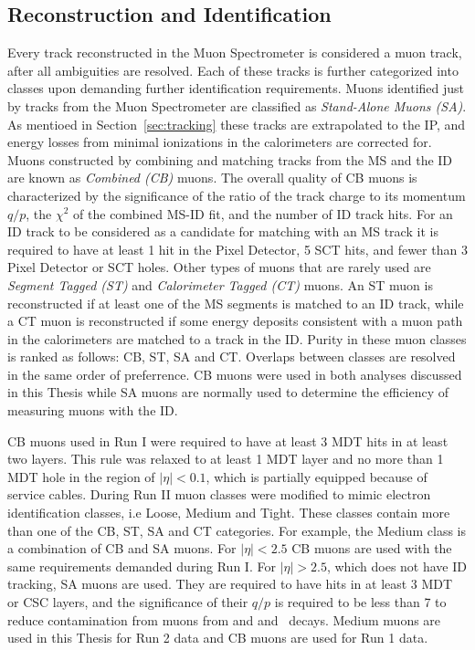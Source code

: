 \subsection{Reconstruction and Identification}
\label{sec:muReco}
\par Every track reconstructed in the Muon Spectrometer is considered a muon track, 
after all ambiguities are resolved. Each of these tracks is further categorized into 
classes upon demanding further identification requirements. Muons identified 
just by tracks from the Muon Spectrometer are classified as {\it Stand-Alone 
Muons (SA)}. As mentioed in Section~\ref{sec:tracking} these tracks are extrapolated to the IP, 
and energy losses from minimal ionizations in the calorimeters are corrected for. 
Muons constructed by combining and matching tracks from the MS and the ID are 
known as {\it Combined (CB)} muons. The overall quality of CB muons is characterized by the significance of 
the ratio of the track charge to its momentum $q/p$, the $\chi^2$ of the combined 
MS-ID fit, and the number of ID track hits. For an ID track to be considered as 
a candidate for matching with an MS track it is required to have at least 1 hit 
in the Pixel Detector, 5 SCT hits, and fewer than 3 Pixel Detector or SCT holes. 
Other types of muons that are rarely used are {\it Segment Tagged (ST)} and 
{\it Calorimeter Tagged (CT)} muons. An ST muon is reconstructed if at least one 
of the MS segments is matched to an ID track, while a CT muon is reconstructed if 
some energy deposits consistent with a muon path in the calorimeters are matched 
to a track in the ID. Purity in these muon classes is ranked as follows: CB, ST, 
SA and CT. Overlaps between classes are resolved in the same order 
of preferrence. CB muons were used in both analyses discussed in this Thesis while 
SA muons are normally used to determine the efficiency of measuring muons with the 
ID. 

\par CB muons used in Run I were required to have at least 3 MDT hits in at least two 
layers. This rule was relaxed to at least 1 MDT layer  and no more than 1 MDT hole in 
the region of $|\eta|<0.1$, which is partially equipped because of service cables.
During Run II muon classes were modified to mimic electron identification classes, 
i.e Loose, Medium and Tight. These classes contain more than one of the CB, ST, SA and 
CT categories. For example, the Medium class is a combination of CB and SA muons. 
For $|\eta|<2.5$ CB muons are used with the same requirements demanded during Run I. For 
$|\eta|>2.5$, which does not have ID tracking, SA muons are used. They are required to have 
hits in at least 3 MDT or CSC layers, and the significance of their $q/p$ is required to be 
less than 7 to reduce contamination from muons from \kaon and  
and \pipm\ decays. Medium muons are used in this Thesis for Run 2 data and CB muons 
are used for Run 1 data.   

